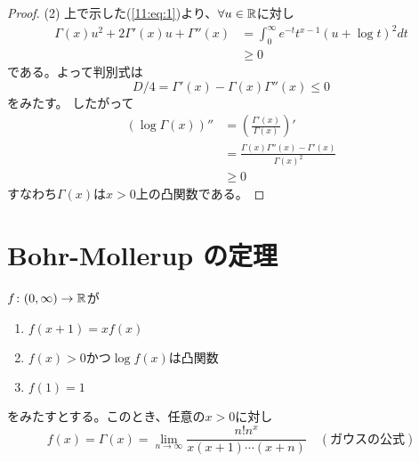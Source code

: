 \documentclass[report]{jlreq}
\begin{document}
\begin{proof}
    (2)
    上で示した(\ref{11:eq:1})より、$\forall u \in \mathbb{R}$に対し
    \begin{equation}
        \begin{split}
            \Gamma(x) u^2 + 2 \Gamma'(x) u + \Gamma''(x)
                &= \int_0^\infty e^{-t} t^{x-1} (u + \log t)^2 dt \\
                &\ge 0
        \end{split}
    \end{equation}
    である。よって判別式は
    \begin{equation}
        D/4 = \Gamma'(x) - \Gamma(x) \Gamma''(x) \le 0
    \end{equation}
    をみたす。
    したがって
    \begin{equation}
        \begin{split}
            (\log \Gamma(x))''
                &= \left(\frac{\Gamma'(x)}{\Gamma(x)}\right)' \\
                &= \frac{\Gamma(x) \Gamma''(x) - \Gamma'(x) }{\Gamma(x)^2} \\
                &\ge 0
        \end{split}
    \end{equation}
    すなわち$\Gamma(x)$は$x > 0$上の凸関数である。
\end{proof}




%
\section{Bohr-Mollerup の定理}

    \begin{theorem}
        $f \colon (0, \infty) \to \mathbb{R}$が
        \begin{enumerate}
            \item $f(x + 1) = x f(x)$
            \item $f(x) > 0$かつ$\log f(x)$は凸関数
            \item $f(1) = 1$
        \end{enumerate}
        をみたすとする。このとき、任意の$x > 0$に対し
        \begin{equation}
            f(x) = \Gamma(x) = \lim_{n \to \infty} \frac{n! n^x}{x(x + 1) \cdots (x + n)}
            \quad (\text{ガウスの公式})
            \label{eq:12:1}
        \end{equation}
        \label{11:thm:2}
    \end{theorem}
\end{document}

